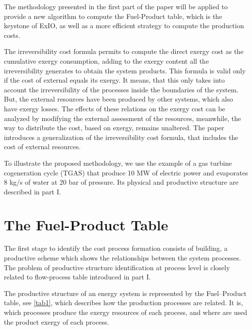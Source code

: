 \documentclass{ecos2018}
\begin{document}
The methodology presented in the first part of the paper will be applied to provide a new algorithm to compute the Fuel-Product table, which is the keystone of ExIO, as well as a more efficient strategy to compute the production costs.

The irreversibility cost formula \cite{Torres09} permits to compute the direct exergy cost as the cumulative exergy consumption, adding to the exergy content all the irreversibility generates to obtain the system products. This formula is valid only if the cost of external equals its exergy. It means, that this only takes into account the irreversibility of the processes inside the boundaries of the system. But, the external resources have been produced by other systems, which also have exergy losses. The effects of these relations on the exergy cost can be analyzed by modifying the external assessment of the resources, meanwhile, the way to distribute the cost, based on exergy, remains unaltered. The paper introduces a generalization of the irreversibility cost formula, that includes the cost of external resources.

To illustrate the proposed methodology, we use the example of a gas turbine cogeneration cycle (TGAS) that produce 10 MW of electric power and evaporates 8 kg/s of water at 20 bar of pressure. Its physical and productive structure are described in part I.

\section{The Fuel-Product Table}
The first stage to identify the cost process formation consists of building, a productive scheme which shows the relationships between the system processes. The problem of productive structure identification at process level is closely related to flow-process table introduced in part I.

The productive structure of an energy system is represented by the Fuel--Product table, see \cref{tab1}, which describes how the production processes are related. It is, which processes produce the exergy resources of each process, and where are used the product exergy of each process.
\end{document}
